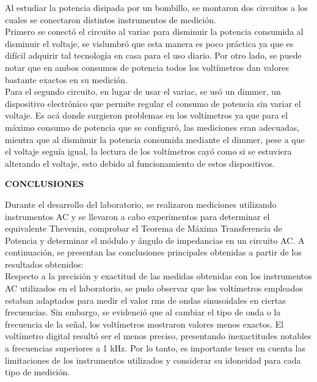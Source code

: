\documentclass[12pt]{article}
\begin{document}
\begin{enumerate}
		\noindent Al estudiar la potencia disipada por un bombillo, se montaron dos circuitos a los cuales se conectaron distintos instrumentos de medición.\\
		
		\noindent Primero se conectó el circuito al variac para disminuir la potencia consumida al disminuir el voltaje, se vislumbró que esta manera es poco práctica ya que es difícil adquirir tal tecnología en casa para el uso diario. Por otro lado, se puede notar que en ambos consumos de potencia todos los voltímetros dan valores bastante exactos en su medición.\\
		
		\noindent Para el segundo circuito, en lugar de usar el variac, se usó un dimmer, un dispositivo electrónico que permite regular el consumo de potencia sin variar el voltaje. Es acá donde surgieron problemas en los voltímetros ya que para el máximo consumo de potencia que se configuró, las mediciones eran adecuadas, mientra que al disminuir la potencia consumida mediante el dimmer, pese a que el voltaje seguía igual, la lectura de los voltímetros cayó como si se estuviera alterando el voltaje, esto debido al funcionamiento de estos dispositivos.
		
	\end{enumerate}
	
	\newpage
	
	\begin{center}
		\textbf{\large CONCLUSIONES}\\
	\end{center}
	
	Durante el desarrollo del laboratorio, se realizaron mediciones utilizando instrumentos AC y se llevaron a cabo experimentos para determinar el equivalente Thevenin, comprobar el Teorema de Máxima Transferencia de Potencia y determinar el módulo y ángulo de impedancias en un circuito AC. A continuación, se presentan las conclusiones principales obtenidas a partir de los resultados obtenidos:\\
	
	Respecto a la precisión y exactitud de las medidas obtenidas con los instrumentos AC utilizados en el laboratorio, se pudo observar que los voltímetros empleados estaban adaptados para medir el valor rms de ondas sinusoidales en ciertas frecuencias. Sin embargo, se evidenció que al cambiar el tipo de onda o la frecuencia de la señal, los voltímetros mostraron valores menos exactos. El voltímetro digital resultó ser el menos preciso, presentando inexactitudes notables a frecuencias superiores a 1 kHz. Por lo tanto, es importante tener en cuenta las limitaciones de los instrumentos utilizados y considerar su idoneidad para cada tipo de medición.\\
	
\end{document}
